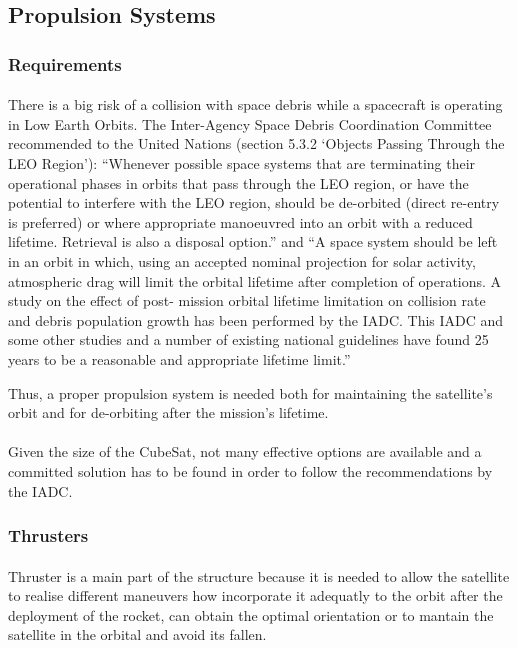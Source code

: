 \subsection{Propulsion Systems}

\subsubsection{Requirements}

\paragraph{}
There is a big risk of a collision with space debris while a spacecraft is operating in Low Earth Orbits. The Inter-Agency Space Debris Coordination Committee recommended to the United Nations (section 5.3.2 ‘Objects Passing Through the LEO Region’): “Whenever possible space systems that are terminating their operational phases in orbits that pass through the LEO region, or have the potential to interfere with the LEO region, should be de-orbited (direct re-entry is preferred) or where appropriate manoeuvred into an orbit with a reduced lifetime. Retrieval is also a disposal option.” and “A space system should be left in an orbit in which, using an accepted nominal projection for solar activity, atmospheric drag will limit the orbital lifetime after completion of operations. A study on the effect of post- mission orbital lifetime limitation on collision rate and debris population growth has been performed by the IADC. This IADC and some other studies and a number of existing national guidelines have found 25 years to be a reasonable and appropriate lifetime limit.” \cite{collisionLEO}

Thus, a proper propulsion system is needed both for maintaining the satellite's orbit and for de-orbiting after the mission's lifetime.

\paragraph{}
Given the size of the CubeSat, not many effective options are available and a committed solution has to be found in order to follow the recommendations by the IADC.


\subsubsection{Thrusters}

\paragraph{}
Thruster is a main part of the structure because it is needed to allow the satellite to realise different maneuvers how incorporate it adequatly to the orbit after the deployment of the rocket, can obtain the optimal orientation or to mantain the satellite in the orbital and avoid its fallen. 

